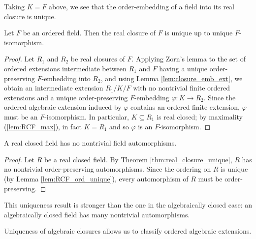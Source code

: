 Taking $K=F$ above, we see that the order-embedding of a field into its real closure is unique.

\begin{theorem}
  \label{thm:real_closure_unique}
  Let $F$ be an ordered field. Then the real closure of $F$ is unique up to unique $F$-isomorphism.
\end{theorem}
\begin{proof}
  Let $R_1$ and $R_2$ be real closures of $F$. Applying Zorn's lemma to the set of ordered extensions intermediate between $R_1$ and $F$ having a unique order-preserving $F$-embedding into $R_2$, and using Lemma \ref{lem:closure_emb_ext}, we obtain an intermediate extension $R_1/K/F$ with no nontrivial finite ordered extensions and a unique order-preserving $F$-embedding $\varphi:K\to R_2$. Since the ordered algebraic extension induced by $\varphi$ contains an ordered finite extension, $\varphi$ must be an $F$-isomorphism. In particular, $K\subseteq R_1$ is real closed; by maximality (\ref{lem:RCF_max}), in fact $K=R_1$ and so $\varphi$ is an $F$-isomorphism.
\end{proof}

\begin{corollary}
  \label{cor:RCF_no_auto}
  A real closed field has no nontrivial field automorphisms.
\end{corollary}
\begin{proof}
  Let $R$ be a real closed field. By Theorem \ref{thm:real_closure_unique}, $R$ has no nontrivial order-preserving automorphisms. Since the ordering on $R$ is unique (by Lemma \ref{lem:RCF_ord_unique}), every automorphism of $R$ must be order-preserving.
\end{proof}

This uniqueness result is stronger than the one in the algebraically closed case: an algebraically closed field has many nontrivial automorphisms.

Uniqueness of algebraic closures allows us to classify ordered algebraic extensions.

